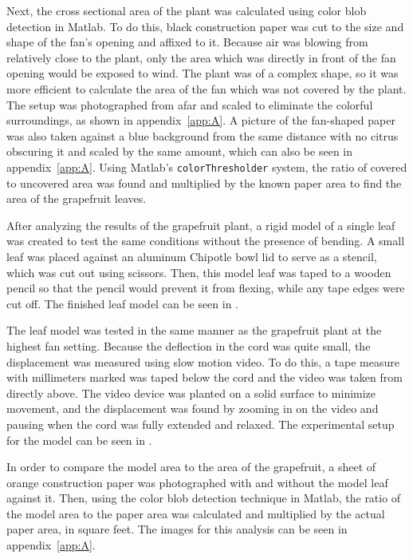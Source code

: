 Next, the cross sectional area of the plant was calculated using color blob detection in Matlab. To do this, black construction paper was cut to the size and shape of the fan's opening and affixed to it. Because air was blowing from relatively close to the plant, only the area which was directly in front of the fan opening would be exposed to wind. The plant was of a complex shape, so it was more efficient to calculate the area of the fan which was not covered by the plant. The setup was photographed from afar and scaled to eliminate the colorful surroundings, as shown in appendix~\ref{app:A}. A picture of the fan-shaped paper was also taken against a blue background from the same distance with no citrus obscuring it and scaled by the same amount, which can also be seen in appendix~\ref{app:A}. Using Matlab's \lstinline{colorThresholder} system, the ratio of covered to uncovered area was found and multiplied by the known paper area to find the area of the grapefruit leaves.

After analyzing the results of the grapefruit plant, a rigid model of a single leaf was created to test the same conditions without the presence of bending. A small leaf was placed against an aluminum Chipotle bowl lid to serve as a stencil, which was cut out using scissors. Then, this model leaf was taped to a wooden pencil so that the pencil would prevent it from flexing, while any tape edges were cut off. The finished leaf model can be seen in . 

The leaf model was tested in the same manner as the grapefruit plant at the highest fan setting. Because the deflection in the cord was quite small, the displacement was measured using slow motion video. To do this, a tape measure with millimeters marked was taped below the cord and the video was taken from directly above. The video device was planted on a solid surface to minimize movement, and the displacement was found by zooming in on the video and pausing when the cord was fully extended and relaxed. The experimental setup for the model can be seen in .

In order to compare the model area to the area of the grapefruit, a sheet of orange construction paper was photographed with and without the model leaf against it. Then, using the color blob detection technique in Matlab, the ratio of the model area to the paper area was calculated and multiplied by the actual paper area, in square feet. The images for this analysis can be seen in appendix~\ref{app:A}.

